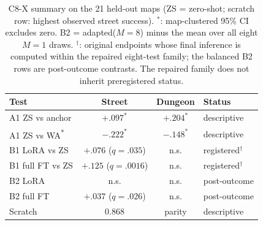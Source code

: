 \documentclass[letterpaper]{article} %
\newcommand{\stage}[1]{\textsc{#1}}
\begin{document}
\begin{table}[!t]
\centering
\footnotesize
\setlength{\tabcolsep}{1.4pt}
\begin{tabular}{@{}lccl@{}}
\toprule
Test & Street & Dungeon & Status \\
\midrule
A1 ZS vs anchor & $+.097^{*}$ & $+.204^{*}$ & descriptive \\
A1 ZS vs WA\textsuperscript{*} & $-.222^{*}$ & $-.148^{*}$ & descriptive \\
B1 LoRA vs ZS & $+.076$ ($q{=}.035$) & n.s. & registered$^{\dagger}$ \\
B1 full FT vs ZS & $+.125$ ($q{=}.0016$) & n.s. & registered$^{\dagger}$ \\
B2 LoRA & n.s. & n.s. & post-outcome \\
B2 full FT & $+.037$ ($q{=}.026$) & n.s. & post-outcome \\
Scratch & 0.868 & parity & descriptive \\
\bottomrule
\end{tabular}
\caption{\stage{C8-X} summary on the 21 held-out maps (ZS = zero-shot; scratch row: highest observed street success). $^{*}$: map-clustered 95\% CI excludes zero. B2 = adapted($M{=}8$) minus the mean over all eight $M{=}1$ draws. $^{\dagger}$: original endpoints whose final inference is computed within the repaired eight-test family; the balanced B2 rows are post-outcome contrasts. The repaired family does not inherit preregistered status.}
\label{tab:c8x-summary}
\end{table}


\end{document}
